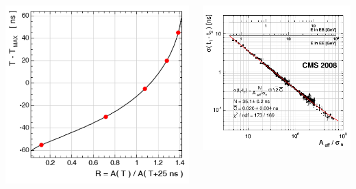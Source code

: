 \documentclass{beamer}
\begin{document}
\begin{frame}
\begin{minipage}[b]{\textwidth}
\begin{tcolorbox}[colback=UNL@Cream!5,colframe=UNL@Cream!70,title=\textcolor{UMN@Maroon}{\textbf{Time Measurement}}]
\begin{columns}
\begin{column}{0.36\textwidth}
{         \includegraphics[height=0.58\textwidth, width=0.45\linewidth]{THESISPLOTS/TMaxPhaseVsRatio.png}
         }
        \end{column}%
    
     \begin{column}{0.60\textwidth}
       \includegraphics[height=0.65\textwidth, width=0.63\linewidth]{THESISPLOTS/ECAL_Timing_Resolution.png}        
     \end{column} 
   \end{columns} 
     
  \end{tcolorbox}
\end{minipage}
\end{frame}
   
\end{document}
